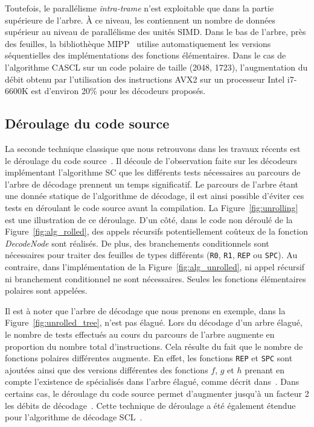 Toutefois, le parallélisme \textit{intra-trame} n'est exploitable que dans la partie supérieure de l'arbre. \`A ce niveau, les \noeuds contiennent un nombre de données supérieur au niveau de parallélisme des unités SIMD. Dans le bas de l'arbre, près des feuilles, la bibliothèque MIPP~\cite{cassagne_efficient_2015} utilise automatiquement les versions séquentielles des implémentations des fonctions élémentaires. Dans le cas de l'algorithme CASCL sur un code polaire de taille (2048, 1723), l'augmentation du débit obtenu par l'utilisation des instructions AVX2 sur un processeur Intel i7-6600K est d'environ 20\% pour les décodeurs proposés.

\subsection{Déroulage du code source}
\label{subsec:unroll}
La seconde technique classique que nous retrouvons dans les travaux récents est le déroulage du code source~\cite{sarkis_autogenerating_2014,giard_fast_2014,cassagne_efficient_2015,cassagne_energy_2016}. Il découle de l'observation faite sur les décodeurs implémentant l'algorithme SC que les différents tests nécessaires au parcours de l'arbre de décodage prennent un temps significatif. Le parcours de l'arbre étant une donnée statique de l'algorithme de décodage, il est ainsi possible d'éviter ces tests en \og déroulant \fg le code source avant la compilation. La Figure~\ref{fig:unrolling} est une illustration de ce déroulage. D'un côté, dans le code non déroulé de la Figure~\ref{fig:alg_rolled}, des appels récursifs potentiellement coûteux de la fonction \textit{DecodeNode} sont réalisés. De plus, des branchements conditionnels sont nécessaires pour traiter des feuilles de types différents (\texttt{R0}, \texttt{R1}, \texttt{REP} ou \texttt{SPC}). Au contraire, dans l'implémentation de la Figure~\ref{fig:alg_unrolled}, ni appel récursif ni branchement conditionnel ne sont nécessaires. Seules les fonctions élémentaires polaires sont appelées.

Il est à noter que l'arbre de décodage que nous prenons en exemple, dans la Figure~\ref{fig:unrolled_tree}, n'est pas élagué. Lors du décodage d'un arbre élagué, le nombre de tests effectués au cours du parcours de l'arbre augmente en proportion du nombre total d'instructions. Cela résulte du fait que le nombre de fonctions polaires différentes augmente. En effet, les fonctions \texttt{REP} et \texttt{SPC} sont ajoutées ainsi que des versions différentes des fonctions $f$, $g$ et $h$ prenant en compte l'existence de \noeuds spécialisés dans l'arbre élagué, comme décrit dans~\cite{sarkis_fast_2014,cassagne_efficient_2015}. Dans certains cas, le déroulage du code source permet d'augmenter jusqu'à un facteur 2 les débits de décodage~\cite{sarkis_autogenerating_2014}. Cette technique de déroulage a été également étendue pour l'algorithme de décodage SCL~\cite{sarkis_fast_2016}.

